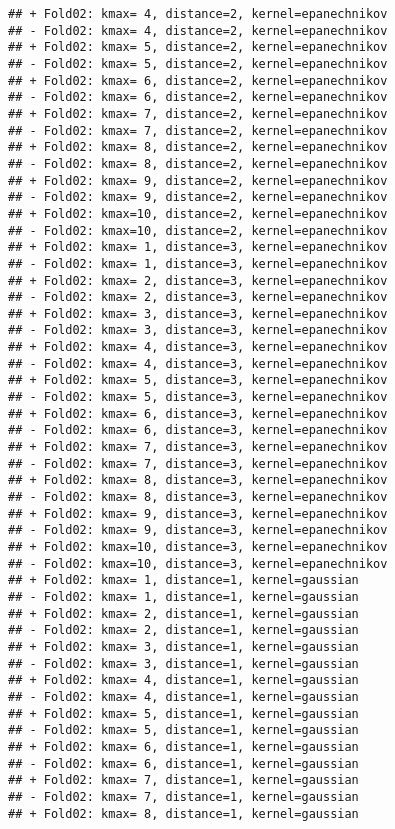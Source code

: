 \documentclass[
]{article}
\begin{document}
\begin{verbatim}
## + Fold02: kmax= 4, distance=2, kernel=epanechnikov 
## - Fold02: kmax= 4, distance=2, kernel=epanechnikov 
## + Fold02: kmax= 5, distance=2, kernel=epanechnikov 
## - Fold02: kmax= 5, distance=2, kernel=epanechnikov 
## + Fold02: kmax= 6, distance=2, kernel=epanechnikov 
## - Fold02: kmax= 6, distance=2, kernel=epanechnikov 
## + Fold02: kmax= 7, distance=2, kernel=epanechnikov 
## - Fold02: kmax= 7, distance=2, kernel=epanechnikov 
## + Fold02: kmax= 8, distance=2, kernel=epanechnikov 
## - Fold02: kmax= 8, distance=2, kernel=epanechnikov 
## + Fold02: kmax= 9, distance=2, kernel=epanechnikov 
## - Fold02: kmax= 9, distance=2, kernel=epanechnikov 
## + Fold02: kmax=10, distance=2, kernel=epanechnikov 
## - Fold02: kmax=10, distance=2, kernel=epanechnikov 
## + Fold02: kmax= 1, distance=3, kernel=epanechnikov 
## - Fold02: kmax= 1, distance=3, kernel=epanechnikov 
## + Fold02: kmax= 2, distance=3, kernel=epanechnikov 
## - Fold02: kmax= 2, distance=3, kernel=epanechnikov 
## + Fold02: kmax= 3, distance=3, kernel=epanechnikov 
## - Fold02: kmax= 3, distance=3, kernel=epanechnikov 
## + Fold02: kmax= 4, distance=3, kernel=epanechnikov 
## - Fold02: kmax= 4, distance=3, kernel=epanechnikov 
## + Fold02: kmax= 5, distance=3, kernel=epanechnikov 
## - Fold02: kmax= 5, distance=3, kernel=epanechnikov 
## + Fold02: kmax= 6, distance=3, kernel=epanechnikov 
## - Fold02: kmax= 6, distance=3, kernel=epanechnikov 
## + Fold02: kmax= 7, distance=3, kernel=epanechnikov 
## - Fold02: kmax= 7, distance=3, kernel=epanechnikov 
## + Fold02: kmax= 8, distance=3, kernel=epanechnikov 
## - Fold02: kmax= 8, distance=3, kernel=epanechnikov 
## + Fold02: kmax= 9, distance=3, kernel=epanechnikov 
## - Fold02: kmax= 9, distance=3, kernel=epanechnikov 
## + Fold02: kmax=10, distance=3, kernel=epanechnikov 
## - Fold02: kmax=10, distance=3, kernel=epanechnikov 
## + Fold02: kmax= 1, distance=1, kernel=gaussian 
## - Fold02: kmax= 1, distance=1, kernel=gaussian 
## + Fold02: kmax= 2, distance=1, kernel=gaussian 
## - Fold02: kmax= 2, distance=1, kernel=gaussian 
## + Fold02: kmax= 3, distance=1, kernel=gaussian 
## - Fold02: kmax= 3, distance=1, kernel=gaussian 
## + Fold02: kmax= 4, distance=1, kernel=gaussian 
## - Fold02: kmax= 4, distance=1, kernel=gaussian 
## + Fold02: kmax= 5, distance=1, kernel=gaussian 
## - Fold02: kmax= 5, distance=1, kernel=gaussian 
## + Fold02: kmax= 6, distance=1, kernel=gaussian 
## - Fold02: kmax= 6, distance=1, kernel=gaussian 
## + Fold02: kmax= 7, distance=1, kernel=gaussian 
## - Fold02: kmax= 7, distance=1, kernel=gaussian 
## + Fold02: kmax= 8, distance=1, kernel=gaussian 

\end{verbatim}
\end{document}
